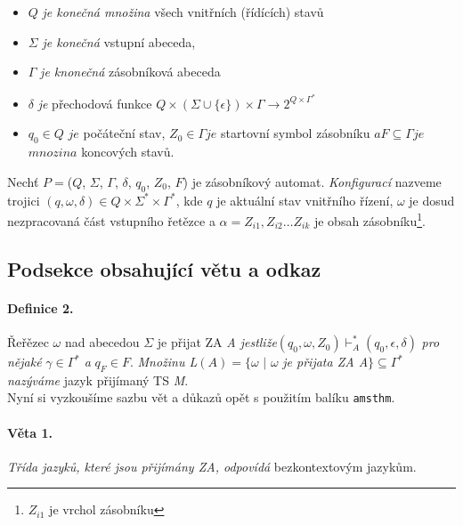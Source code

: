 \documentclass[a4paper,11pt,twocolumn]{article}
\begin{document}
\begin{itemize}

\item $Q$ \emph{je konečná množina} všech vnitřních (řídících) stavů

\item $\Sigma$ \emph{je konečná} vstupní abeceda,

\item $\Gamma$ \emph{je knonečná} zásobníková abeceda

\item $\delta$ \emph{je} přechodová funkce $Q \times(\Sigma \cup \{ \epsilon \})\times \Gamma \to 2^{Q\times\Gamma ^*}$

\item $q_0\in Q$ $je$ počáteční stav, $Z_0 \in \Gamma je$ startovní symbol \linebreak zásobníku $a F \subseteq \Gamma je$ $mnozina$ koncových stavů.

\end{itemize}

Nechť $P = $($Q$, $\Sigma$, $\Gamma$, $\delta$, $q_0$, $Z_0$, $F$) je zásobníkový automat. \emph{Konfigurací} nazveme trojici $(q, \omega , \delta ) \in Q \times \Sigma^* \times \Gamma^*$, kde $q$ je aktuální stav vnitřního řízení, $\omega$ je dosud nezpracovaná část vstupního řetězce a $\alpha = Z_{i1}, Z_{i2} \dots Z_{ik}$ je obsah zásobníku\footnote{$Z_{i1}$ je vrchol zásobníku}.

\subsection{Podsekce obsahující větu a odkaz}

\paragraph{Definice 2.}
Řeřězec $\omega$ nad abecedou $\Sigma$ je přijat ZA \emph{A jestliže}$(q_0, \omega, Z_0) \vdash_A^* (q_0, \epsilon, \delta)$ \emph{pro nějaké} $\gamma \in \Gamma^*$ \emph{a} $q_F \in F$. \emph{Množinu L}$(A) = \{ \omega$ $|$ $\omega$ \emph{je přijata ZA A}$\} \subseteq \Gamma^*$ \emph{nazýváme} jazyk přijímaný TS \emph{M}.
\\

Nyní si vyzkoušíme sazbu vět a důkazů opět s použitím balíku \verb|amsthm|.

\paragraph{Věta 1.}
\emph{Třída jazyků, které jsou přijímány ZA, odpovídá} bezkontextovým jazykům.
\end{document}
